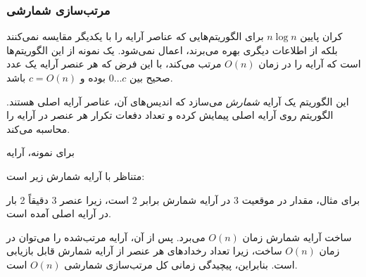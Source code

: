 \subsubsection{مرتب‌سازی شمارشی}


کران پایین $n \log n$ برای الگوریتم‌هایی که عناصر آرایه را با یکدیگر مقایسه نمی‌کنند
بلکه از اطلاعات دیگری بهره می‌برند، اعمال نمی‌شود.
یک نمونه از این الگوریتم‌ها  است که آرایه را در زمان
$O(n)$ مرتب می‌کند، با این فرض که هر عنصر آرایه
یک عدد صحیح بین $0 \ldots c$ بوده و $c=O(n)$ باشد.

این الگوریتم یک آرایه \emph{شمارش} می‌سازد
که اندیس‌های آن، عناصر آرایه اصلی هستند.
الگوریتم روی آرایه اصلی پیمایش کرده
و تعداد دفعات تکرار هر عنصر در آرایه را محاسبه می‌کند.
\newpage

برای نمونه، آرایه
\begin{center}
\end{center}
متناظر با آرایه شمارش زیر است:
\begin{center}
\end{center}

برای مثال، مقدار در موقعیت 3 در آرایه شمارش برابر 2 است،
زیرا عنصر 3 دقیقاً 2 بار در آرایه اصلی آمده است.

ساخت آرایه شمارش زمان $O(n)$ می‌برد. پس از آن،
آرایه مرتب‌شده را می‌توان در زمان $O(n)$ ساخت، زیرا
تعداد رخدادهای هر عنصر از آرایه شمارش قابل بازیابی است.
بنابراین، پیچیدگی زمانی کل مرتب‌سازی شمارشی $O(n)$ است.

